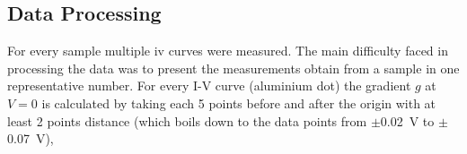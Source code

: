 \subsection{Data Processing}
\label{sec:eval}
For every sample multiple \gls{iv} curves were measured. 
The main difficulty faced in processing the data was to present the measurements obtain 
from a sample in one representative number. 
%
%
For every I-V curve (aluminium dot) the gradient $g$ at $V=0$ is calculated by taking 
each 5 points before and after the origin with at least 2 points distance (which boils
down to the data points from $\pm$\SI{0.02}{\volt} to $\pm$\SI{0.07}{\volt}), 
